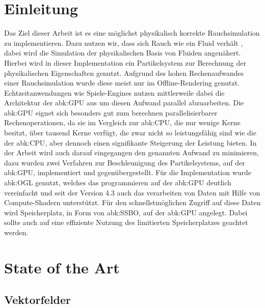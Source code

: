 \documentclass[intern,palatino]{cgBA}
\begin{document}

\section{Einleitung}

Das Ziel dieser Arbeit ist es eine möglichst physikalisch korrekte Rauchsimulation zu implementieren. Dazu nutzen wir, dass sich Rauch wie ein Fluid verhält \cite{stam2003real}, dabei wird die Simulation der physikalischen Basis von Fluiden angenähert. Hierbei wird in dieser Implementation ein Partikelsystem zur Berechnung der physikalischen Eigenschaften genutzt. Aufgrund des hohen Rechenaufwandes einer Rauchsimulation wurde diese meist nur im Offline-Rendering genutzt. Echtzeitanwendungen wie Spiele-Engines nutzen mittlerweile dabei die Architektur der \ac{abk:GPU} aus um diesen Aufwand parallel abzuarbeiten. 
\newline \newline
Die \acl{abk:GPU} eignet sich besonders gut zum berechnen parallelisierbarer Rechenoperationen, da sie im Vergleich zur \ac{abk:CPU}, die nur wenige Kerne besitzt, über tausend Kerne verfügt, die zwar nicht so leistungsfähig sind wie die der \ac{abk:CPU}, aber dennoch einen signifikante Steigerung der Leistung bieten.
\newline \newline
In der Arbeit wird auch darauf eingegangen den genannten Aufwand zu minimieren, dazu wurden zwei Verfahren zur Beschleunigung des Partikelsystems, auf der \ac{abk:GPU},  implementiert und gegenübergestellt.
\newline \newline
Für die Implementation wurde \ac{abk:OGL} genutzt, welches das programmieren auf der \ac{abk:GPU} deutlich vereinfacht und seit der Version 4.3 auch das verarbeiten von Daten mit Hilfe von Compute-Shadern unterstützt. Für den schnellstmöglichen Zugriff auf diese Daten wird Speicherplatz, in Form von \ac{abk:SSBO}, auf der \ac{abk:GPU} angelegt. Dabei sollte auch auf eine effiziente Nutzung des limitierten Speicherplatzes geachtet werden.


\section{State of the Art}
\subsection{Vektorfelder}
\end{document}
